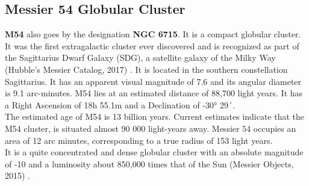 \documentclass[12pt]{article}
\begin{document}
		\subsection{Messier 54 Globular Cluster}
		\textbf{M54} also goes by the designation \textbf{NGC 6715}. It is a compact globular cluster.\\
		It was the first extragalactic cluster ever discovered and is recognized as part of the Sagittarius Dwarf Galaxy (SDG), a satellite galaxy of the Milky Way (Hubble's Messier Catalog, 2017) \cite{nasa_m54}. It is located in the southern constellation Sagittarius. It has an apparent visual magnitude of 7.6 and its angular diameter is 9.1 arc-minutes. M54 lies at an estimated distance of 88,700 light years. It has a Right Ascension of 18h 55.1m and a Declination of -30° 29´.\\
		The estimated age of M54 is 13 billion years. Current estimates indicate that the M54 cluster, is situated almost 90 000 light-years away. Messier 54 occupies an area of 12 arc minutes, corresponding to a true radius of 153 light years.\\
		It is a quite concentrated and dense globular cluster with an absolute magnitude of -10 and a luminosity about 850,000 times that of the Sun (Messier Objects, 2015) \cite{messier54}.
\end{document}
